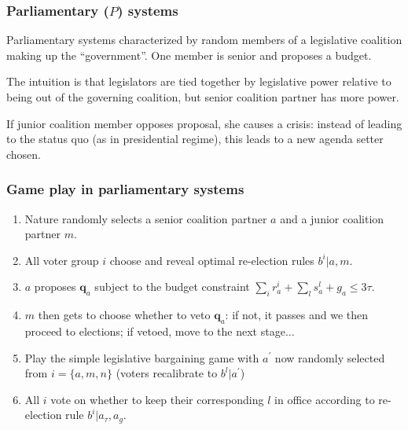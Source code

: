 \documentclass[11pt,aspectratio=169]{beamer}
\begin{document}
\begin{frame}
\frametitle{Parliamentary ($P$) systems}

\noindent Parliamentary systems characterized by random members of a legislative coalition making up the ``government''. One member is senior and proposes a budget. 

\medskip

The intuition is that legislators are tied together by legislative power relative to being out of the governing coalition, but senior coalition partner has more power. 

\bigskip

If junior coalition member opposes proposal, she causes a crisis: instead of leading to the status quo (as in presidential regime), this leads to a new agenda setter chosen.

\end{frame}

\begin{frame}
\frametitle{Game play in parliamentary systems}

\begin{enumerate}
\item Nature randomly selects a senior coalition partner $a$ and a junior coalition partner $m$.

\item All voter group $i$ choose and reveal optimal re-election rules $b^i|a,m$.

\item $a$ proposes $\textbf{q}_a$ subject to the budget constraint $\sum_i r_a^i + \sum_l s_a^l + g_a \leq 3 \tau$.

\item $m$ then gets to choose whether to veto $\textbf{q}_a$: if not, it passes and we then proceed to elections; if vetoed, move to the next stage...

\item Play the simple legislative bargaining game with $a^{\prime}$ now randomly selected from $i=\{a, m, n\}$ (voters recalibrate to $b^l|a^{\prime}$)

\item All $i$ vote on whether to keep their corresponding $l$ in office according to re-election rule $b^i|a_{\tau},a_g$.
\end{enumerate}

\end{frame}
\end{document}
